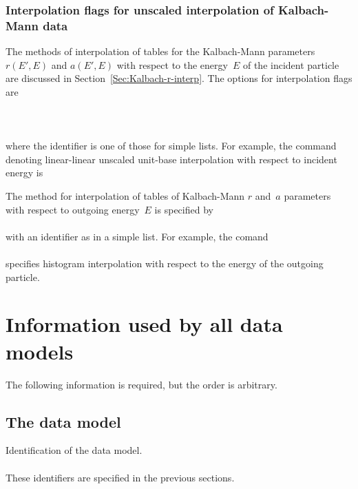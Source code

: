 \subsubsection{Interpolation flags for unscaled interpolation of
Kalbach-Mann data}\label{interp-flags-Kalbach-r}
The methods of interpolation of tables for the Kalbach-Mann 
parameters $r(E', E)$ and $a(E', E)$ with respect to the energy~$E$
of the incident particle are discussed in Section~\ref{Sec:Kalbach-r-interp}.
The options for interpolation flags are\\
   \\
   \\
   \\
where the identifier is one of those for simple lists. 
For example, the command denoting linear-linear unscaled unit-base interpolation
with respect to incident energy is\\

The method for interpolation of tables of Kalbach-Mann $r$ and~$a$ parameters
with respect to outgoing energy~$E$ is specified by\\
   \\
with an identifier as in a simple list.  For example, the comand\\
   \\
specifies histogram interpolation with respect to the energy of
the outgoing particle.

\section{Information used by all data models}
The following information is required, but the order
is arbitrary.

\subsection{The data model} \label{data-model}
Identification of the data model.\\
  \\
These identifiers are specified in the previous sections.

